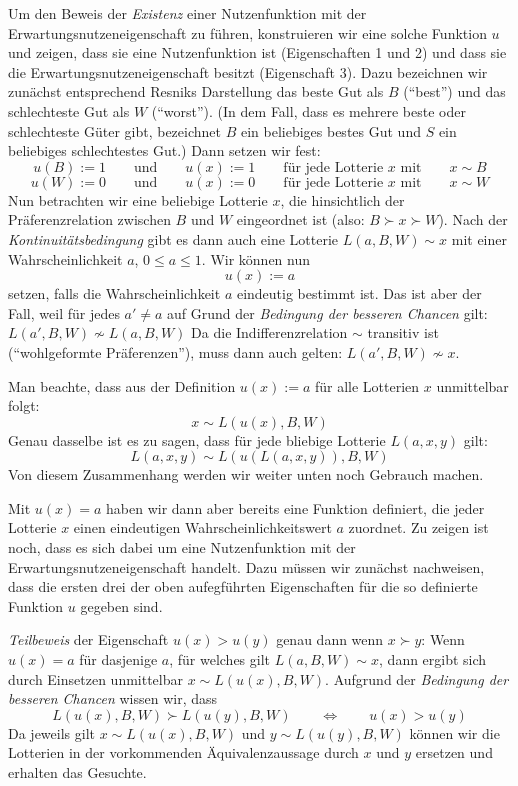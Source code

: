 Um den Beweis der {\em Existenz} einer Nutzenfunktion mit der
Erwartungsnutzeneigenschaft zu führen, konstruieren wir eine solche Funktion $u$
und zeigen, dass sie eine Nutzenfunktion ist (Eigenschaften 1 und 2) und dass sie
die Erwartungsnutzeneigenschaft besitzt (Eigenschaft 3). Dazu bezeichnen wir
zunächst entsprechend Resniks Darstellung \cite[S. 94]{resnik:1987} das beste Gut
als $B$ ("`best"') und das schlechteste Gut als $W$ ("`worst"'). (In dem Fall,
dass es mehrere beste oder schlechteste Güter gibt, bezeichnet $B$ ein beliebiges
bestes Gut und $S$ ein beliebiges schlechtestes Gut.) Dann setzen wir
fest: \[ u(B) := 1
\qquad\mbox{und}\qquad u(x) := 1 \qquad
 \mbox{für jede Lotterie $x$ mit} \qquad x \sim B \] \[ u(W) := 0
\qquad\mbox{und}\qquad u(x) := 0 \qquad \mbox{für jede Lotterie $x$ mit} \qquad x
\sim W \] Nun betrachten wir eine beliebige Lotterie $x$, die hinsichtlich der
Präferenzrelation zwischen $B$ und $W$ eingeordnet ist (also: $B \succ x \succ
W$). Nach der {\em Kontinuitätsbedingung} gibt es dann auch eine Lotterie $L(a,
B, W) \sim x$ mit einer Wahrscheinlichkeit $a$, $0 \leq a \leq 1$. Wir können
nun \[u(x) := a\] setzen, falls
die Wahrscheinlichkeit $a$ eindeutig bestimmt ist. Das ist aber der Fall, weil
für jedes $a' \neq a$ auf Grund der {\em Bedingung der besseren Chancen} gilt:
$L(a', B, W) \not\sim L(a, B, W)$ Da die Indifferenzrelation $\sim$ transitiv ist
("`wohlgeformte Präferenzen"'), muss dann auch gelten: $L(a', B, W) \not\sim x$.

Man beachte, dass aus der Definition $u(x) := a$ für alle Lotterien $x$
unmittelbar folgt:
\[x \sim L(u(x), B, W) \]
Genau dasselbe ist es zu sagen, dass für jede bliebige Lotterie $L(a,
x, y)$ gilt: \[L(a, x, y) \sim L(u(L(a,x,y)), B, W) \]
Von diesem Zusammenhang werden wir weiter unten noch Gebrauch machen.

Mit $u(x) = a$ haben wir dann aber bereits eine Funktion definiert, die jeder
Lotterie $x$ einen eindeutigen Wahrscheinlichkeitswert $a$ zuordnet. Zu zeigen
ist noch, dass es sich dabei um eine Nutzenfunktion mit der
Erwartungsnutzeneigenschaft handelt. Dazu müssen wir zunächst nachweisen, dass
die ersten drei der oben aufegführten Eigenschaften für die so definierte
Funktion $u$ gegeben sind. 

{\em Teilbeweis} der Eigenschaft $u(x) > u(y)$ genau dann wenn $x \succ y$:
Wenn $u(x) = a$ für dasjenige $a$, für welches gilt $L(a, B, W) \sim x$, dann
ergibt sich durch Einsetzen unmittelbar $x \sim L(u(x), B, W)$. Aufgrund der
{\em Bedingung der besseren Chancen} wissen wir, dass 
\[ L(u(x), B, W) \succ L(u(y), B, W) \qquad \Leftrightarrow \qquad u(x) > u(y)
\] 
Da jeweils gilt $x \sim L(u(x), B, W)$ und $y \sim L(u(y), B, W)$ können wir
die Lotterien in der vorkommenden Äquivalenzaussage durch $x$ und $y$ ersetzen
und erhalten das Gesuchte.


